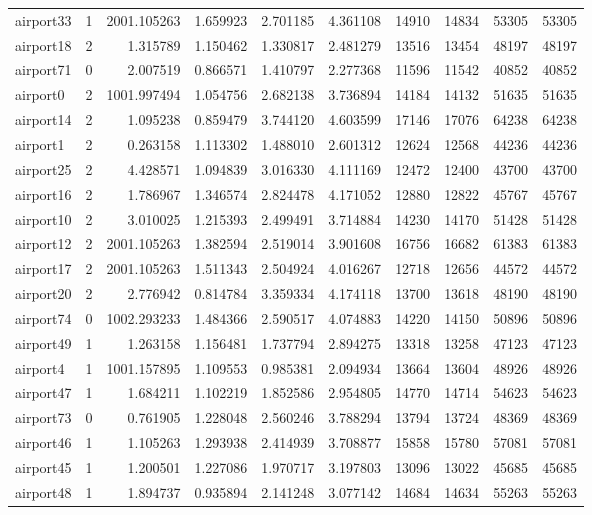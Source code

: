 \begin{longtable}{|l|r|r|r|r|r|r|r|r|r|}
airport33 & 1 & 2001.105263 & 1.659923 & 2.701185 & 4.361108 & 14910 & 14834 & 53305 & 53305 \\
airport18 & 2 & 1.315789 & 1.150462 & 1.330817 & 2.481279 & 13516 & 13454 & 48197 & 48197 \\
airport71 & 0 & 2.007519 & 0.866571 & 1.410797 & 2.277368 & 11596 & 11542 & 40852 & 40852 \\
airport0 & 2 & 1001.997494 & 1.054756 & 2.682138 & 3.736894 & 14184 & 14132 & 51635 & 51635 \\
airport14 & 2 & 1.095238 & 0.859479 & 3.744120 & 4.603599 & 17146 & 17076 & 64238 & 64238 \\
airport1 & 2 & 0.263158 & 1.113302 & 1.488010 & 2.601312 & 12624 & 12568 & 44236 & 44236 \\
airport25 & 2 & 4.428571 & 1.094839 & 3.016330 & 4.111169 & 12472 & 12400 & 43700 & 43700 \\
airport16 & 2 & 1.786967 & 1.346574 & 2.824478 & 4.171052 & 12880 & 12822 & 45767 & 45767 \\
airport10 & 2 & 3.010025 & 1.215393 & 2.499491 & 3.714884 & 14230 & 14170 & 51428 & 51428 \\
airport12 & 2 & 2001.105263 & 1.382594 & 2.519014 & 3.901608 & 16756 & 16682 & 61383 & 61383 \\
airport17 & 2 & 2001.105263 & 1.511343 & 2.504924 & 4.016267 & 12718 & 12656 & 44572 & 44572 \\
airport20 & 2 & 2.776942 & 0.814784 & 3.359334 & 4.174118 & 13700 & 13618 & 48190 & 48190 \\
airport74 & 0 & 1002.293233 & 1.484366 & 2.590517 & 4.074883 & 14220 & 14150 & 50896 & 50896 \\
airport49 & 1 & 1.263158 & 1.156481 & 1.737794 & 2.894275 & 13318 & 13258 & 47123 & 47123 \\
airport4 & 1 & 1001.157895 & 1.109553 & 0.985381 & 2.094934 & 13664 & 13604 & 48926 & 48926 \\
airport47 & 1 & 1.684211 & 1.102219 & 1.852586 & 2.954805 & 14770 & 14714 & 54623 & 54623 \\
airport73 & 0 & 0.761905 & 1.228048 & 2.560246 & 3.788294 & 13794 & 13724 & 48369 & 48369 \\
airport46 & 1 & 1.105263 & 1.293938 & 2.414939 & 3.708877 & 15858 & 15780 & 57081 & 57081 \\
airport45 & 1 & 1.200501 & 1.227086 & 1.970717 & 3.197803 & 13096 & 13022 & 45685 & 45685 \\
airport48 & 1 & 1.894737 & 0.935894 & 2.141248 & 3.077142 & 14684 & 14634 & 55263 & 55263 \\

\end{longtable}
